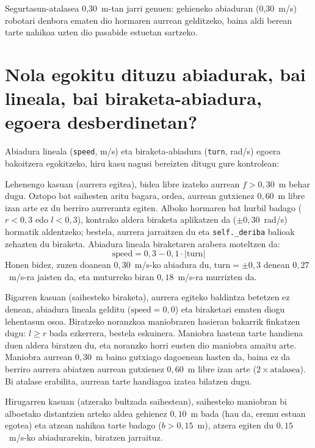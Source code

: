 Segurtasun-atalasea 0,30~m-tan jarri genuen: gehieneko abiaduran (0,30~m/s) robotari denbora ematen dio hormaren aurrean gelditzeko, baina aldi berean tarte nahikoa uzten dio pasabide estuetan sartzeko.

\section[Nola egokitu dituzu abiadurak egoera desberdinetan?][Abiaduren eta biraketen egokitzapena]{Nola egokitu dituzu abiadurak, bai lineala, bai biraketa-abiadura, egoera desberdinetan?}\label{sec:oz-mugimendua}

Abiadura lineala (\texttt{speed}, m/s) eta biraketa-abiadura (\texttt{turn}, rad/s) egoera bakoitzera egokitzeko, hiru kasu nagusi bereizten ditugu gure kontrolean:

Lehenengo kasuan (aurrera egitea), bidea libre izateko aurrean $f > 0{,}30$~m behar dugu. Oztopo bat saihesten aritu bagara, ordea, aurrean gutxienez $0{,}60$~m libre izan arte ez du berriro aurrerantz egiten. Alboko hormaren bat hurbil badago ($r < 0{,}3$ edo $l < 0{,}3$), kontrako aldera biraketa aplikatzen da ($\pm 0{,}30$~rad/s) hormatik aldentzeko; bestela, aurrera jarraitzen du eta \texttt{self.\_deriba} balioak zehazten du biraketa. Abiadura lineala biraketaren arabera moteltzen da:
\[
  \text{speed} = 0{,}3 - 0{,}1 \cdot |\text{turn}|
\]
Honen bidez, zuzen doanean $0{,}30$~m/s-ko abiadura du, $\text{turn} = \pm 0{,}3$ denean $0{,}27$~m/s-ra jaisten da, eta muturreko biran $0{,}18$~m/s-ra murrizten da.

Bigarren kasuan (saihesteko biraketa), aurrera egiteko baldintza betetzen ez denean, abiadura lineala gelditu ($\text{speed} = 0{,}0$) eta biraketari ematen diogu lehentasun osoa. Biratzeko noranzkoa maniobraren hasieran bakarrik finkatzen dugu: $l \ge r$ bada ezkerrera, bestela eskuinera. Maniobra hastean tarte handiena duen aldera biratzen du, eta noranzko horri eusten dio maniobra amaitu arte. Maniobra aurrean $0{,}30$~m baino gutxiago dagoenean hasten da, baina ez da berriro aurrera abiatzen aurrean gutxienez $0{,}60$~m libre izan arte ($2 \times \text{atalasea}$). Bi atalase erabilita, aurrean tarte handiagoa izatea bilatzen dugu.

Hirugarren kasuan (atzerako bultzada saihestean), saihesteko maniobran bi alboetako distantzien arteko aldea gehienez $0{,}10$~m bada (hau da, eremu estuan egotea) eta atzean nahikoa tarte badago ($b > 0{,}15$~m), atzera egiten du $0{,}15$~m/s-ko abiadurarekin, biratzen jarraituz.


